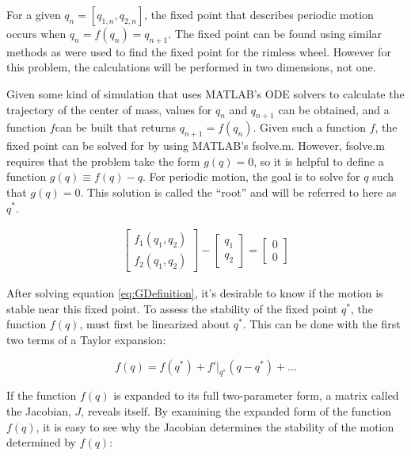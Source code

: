 For a given $q_{n}=[q_{1,n},q_{2,n}]$, the fixed point that describes periodic motion occurs when $q_{n}=f(q_{n})=q_{n+1}$. The fixed point can be found using similar methods as were used to find the fixed point for the rimless wheel. However for this problem, the calculations will be performed in two dimensions, not one.

Given some kind of simulation that uses MATLAB's ODE solvers to calculate the trajectory of the center of mass, values for $q_{n}$ and $q_{n+1}$ can be obtained, and a function $f$can be built that returns $q_{n+1}=f(q_{n})$. Given such a function $f$, the fixed point can be solved for by using MATLAB's fsolve.m. However, fsolve.m requires that the problem take the form $g(q)=0$, so it is helpful to define a function $g(q)\equiv f(q)-q$. For periodic motion, the goal is to solve for $q$ such that $g(q)=0$. This solution is called the ``root'' and will be referred to here as $q^{*}$.

 \begin{align}
 \begin{bmatrix}
 f_{1}(q_{1},q_{2}) \\
 f_{2}(q_{1},q_{2})
 \end{bmatrix}
 -
 \begin{bmatrix}
 q_{1} \\
 q_{2}
 \end{bmatrix}
 =
 \begin{bmatrix}
 0 \\
 0
\end{bmatrix}
\label{eq:GDefinition}
\end{align}


After solving equation \ref{eq:GDefinition}, it's desirable to know if the motion is stable near this fixed point. To assess the stability of the fixed point $q^{*}$, the function $f(q)$, must first be linearized about $q^{*}$. This can be done with the first two terms of a Taylor expansion:

\begin{equation}
f ( q ) = f ( q^{*} ) + f' |_{q^{*}} ( q - q^{*} ) + ...
\label{eq:LinearShorthand}
\end{equation}

If the function $f(q)$ is expanded to its full two-parameter form, a matrix called the Jacobian, $J$, reveals itself. By examining the expanded form of the function $f(q)$, it is easy to see why the Jacobian determines the stability of the motion determined by $f(q)$:

